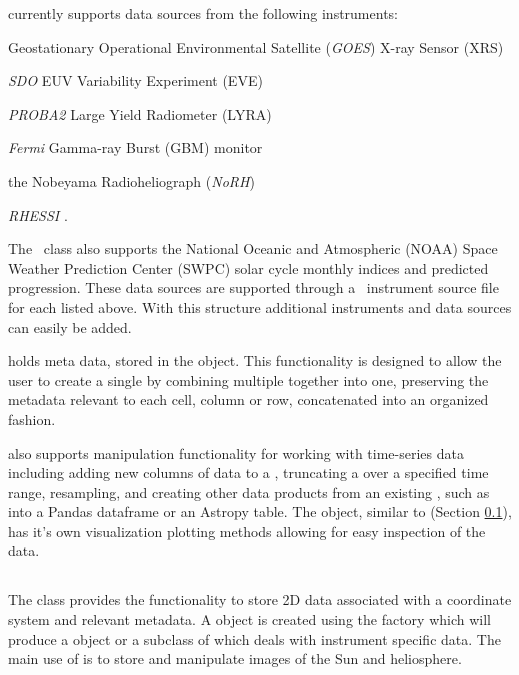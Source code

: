 \Timeseries currently supports data sources from the following instruments: 
\begin{inparaitem}
\item Geostationary Operational Environmental Satellite (\textit{GOES}) X-ray Sensor (XRS) 
\item \textit{SDO} EUV Variability Experiment (EVE) \citep{woods2010extreme}
\item \textit{PROBA2} Large Yield Radiometer (LYRA) \citep{dominique2013lyra}
\item \textit{Fermi} Gamma-ray Burst (GBM) monitor \citep{meegan2009fermi}
\item the Nobeyama Radioheliograph (\textit{NoRH}) \citep{nakajima1994nobeyama}
\item \textit{RHESSI} \citep{lin2003reuven}.
\end{inparaitem}
The \Timeseries\ class also supports the National Oceanic and Atmospheric (NOAA) Space Weather Prediction Center (SWPC) solar cycle monthly indices and predicted progression.
These data sources are supported through a \Timeseries\ instrument source file for each listed above.
With this structure additional instruments and data sources can easily be added.

\Timeseries holds meta data, stored in the \Timeseriesmetadata object.
This functionality is designed to allow the user to create a single \Timeseries by combining multiple \Timeseries together into one, preserving the metadata relevant to each cell, column or row, concatenated into an organized fashion.

\Timeseries also supports manipulation functionality for working with time-series data including adding new columns of data to a \Timeseries, truncating a \Timeseries over a specified time range, resampling, and creating other data products from an existing \Timeseries, such as into a Pandas dataframe or an Astropy table.
The \Timeseries object, similar to \Map (Section \ref{sec:map}), has it's own visualization plotting methods allowing for easy inspection of the data.

\subsection{\Map}
\label{sec:map}

The \Map class provides the functionality to store 2D data associated with a coordinate system and relevant metadata.
A \Map object is created using the \Map factory which will produce a \GenericMap object or a subclass of \GenericMap which deals with instrument specific data.
The main use of \Map is to store and manipulate images of the Sun and heliosphere.


